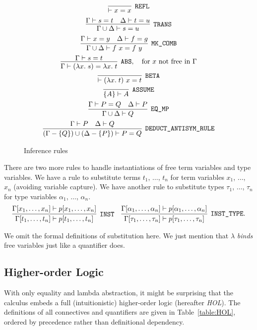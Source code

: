 \begin{figure}
  \begin{gather*}
      \infer[\code{REFL}]{\vdash x = x}{}\\%
      \infer[\code{TRANS}]{\Gamma\cup\Delta\vdash s=u}{\Gamma\vdash s=t&\Delta\vdash t=u}\\
      \infer[\code{MK\_COMB}]{\Gamma\cup\Delta\vdash f\ x=f\ y}{\Gamma\vdash x = y & \Delta \vdash f = g}\\%
      \infer[\code{ABS}, \quad\text{for $x$ not free in $\Gamma$}]{\Gamma \vdash (\lambda x.\; s) = \lambda x.\; t}{\Gamma \vdash s = t}\\
      \infer[\code{BETA}]{\vdash (\lambda x.\; t)\ x = t}{}\\%
      \infer[\code{ASSUME}]{\{A\} \vdash A}{}\\
    \infer[\code{EQ\_MP}]{\Gamma\cup\Delta\vdash Q}{\Gamma\vdash P = Q & \Delta\vdash P}\\%
    \infer[\code{DEDUCT\_ANTISYM\_RULE}]{(\Gamma - \{Q\})\cup(\Delta - \{P\})\vdash P = Q}{\Gamma\vdash P & \Delta\vdash Q}\\
  \end{gather*}
  \caption{Inference rules}
  \label{fig:HOLInferenceRules}
\end{figure}

There are two more rules to handle instantiations of free term variables and type variables. We have a rule to substitute terms $t_1$, $\ldots$, $t_n$ for term variables $x_1$, $\ldots$, $x_n$ (avoiding variable capture). We have another rule to substitute types $\tau_1$, $\ldots$, $\tau_n$ for type variables $\alpha_1$, $\ldots$, $\alpha_n$.
\begin{align*}
  \infer[\code{INST}]{\Gamma[t_1,\ldots,t_n]
    \vdash p[t_1,\ldots,t_n]}
  {\Gamma[x_1,\ldots,x_n]\vdash p[x_1,\ldots,x_n]}&&
  \infer[\code{INST\_TYPE}.]{\Gamma[\tau_1,\ldots,\tau_n]
    \vdash p[\tau_1,\ldots,\tau_n]}
  {\Gamma[\alpha_1,\ldots,\alpha_n]\vdash p[\alpha_1,\ldots,\alpha_n]}
\end{align*}

We omit the formal definitions of substitution here. We just mention that $\lambda$ \emph{binds} free variables just like a quantifier does.

\subsection{Higher-order Logic}
With only equality and lambda abstraction, it might be surprising that the calculus embeds a full (intuitionistic) higher-order logic (hereafter \emph{HOL}). The definitions of all connectives and quantifiers are given in Table~\ref{table:HOL}, ordered by precedence rather than definitional dependency.

